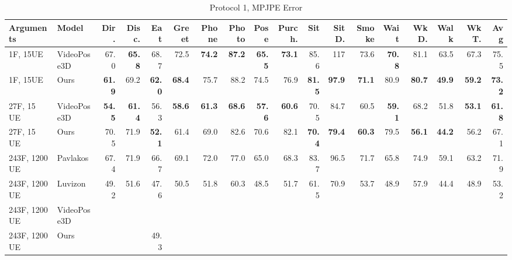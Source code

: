 \documentclass[10pt,twocolumn,letterpaper]{article}
\begin{document}
\begin{center}
\begin{table}
\small
\setlength\tabcolsep{2.3pt}
\begin{tabular}{l|l|rrrrrrrrrrrrrrrr}
Arguments & Model & Dir. & Disc. & Eat & Greet & Phone & Photo & Pose & Purch. & Sit & SitD. & Smoke & Wait & WkD. & Walk & WkT. & \textbf{Avg} \\

\hline
1F, 15UE & VideoPose3D & 67.0 & \textbf{65.8} & 68.7 & 72.5 & \textbf{74.2} & \textbf{87.2} & \textbf{65.5} & \textbf{73.1} & 85.6 & 117 & 73.6 & \textbf{70.8} & 81.1 & 63.5 & 67.3 & 75.5 \\
1F, 15UE & Ours & \textbf{61.9} & 69.2 & \textbf{62.0} & \textbf{68.4} & 75.7 & 88.2 & 74.5 & 76.9 & \textbf{81.5} & \textbf{97.9} & \textbf{71.1} & 80.9 & \textbf{80.7} & \textbf{49.9} & \textbf{59.2} & \textbf{73.2}\\
\hline


27F, 15 UE & VideoPose3D & \textbf{54.5} & \textbf{61.4} & 56.3 & \textbf{58.6} & \textbf{61.3} & \textbf{68.6} & \textbf{57.6} & \textbf{60.6} & 70.5 & 84.7 & 60.5 & \textbf{59.1} & 68.2 & 51.8 & \textbf{53.1} & \textbf{61.8} \\
27F, 15 UE & Ours & 70.5 & 71.9 & \textbf{52.1} & 61.4 & 69.0 & 82.6 & 70.6 & 82.1 & \textbf{70.4} & \textbf{79.4} & \textbf{60.3} & 79.5 & \textbf{56.1} & \textbf{44.2} & 56.2 & 67.1\\
\hline

243F, 1200 UE & Pavlakos \cite{pavlakos2017coarse} & 67.4 & 71.9 & 66.7 & 69.1 & 72.0 & 77.0 & 65.0 & 68.3 & 83.7 & 96.5 & 71.7 & 65.8 & 74.9 & 59.1 & 63.2 & 71.9 \\
243F, 1200 UE & Luvizon \cite{luvizon20182d} & 49.2 & 51.6 & 47.6 & 50.5 & 51.8 & 60.3 & 48.5 & 51.7 & 61.5 & 70.9 & 53.7 & 48.9 & 57.9 & 44.4 & 48.9 & 53.2\\
243F, 1200 UE & VideoPose3D\\
243F, 1200 UE & Ours & & & 49.3\\
 
\hline 

\hline
\end{tabular}

\caption{Protocol 1, MPJPE Error}
\end{table}
\end{center}
\end{document}
